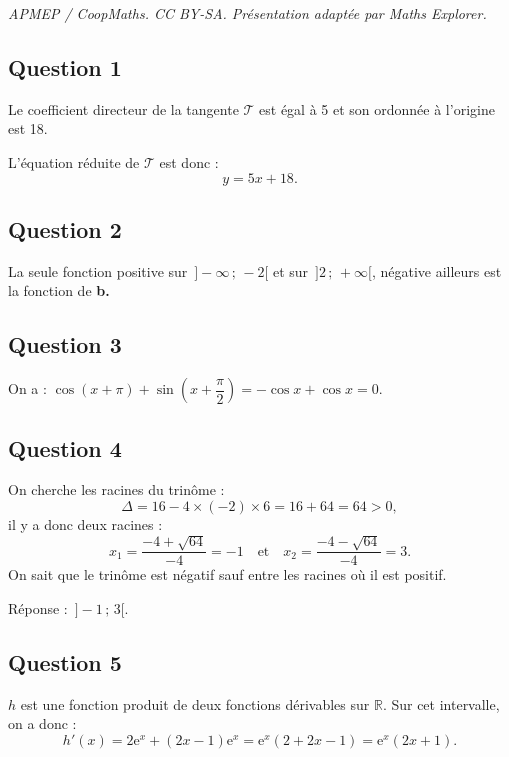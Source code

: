 \documentclass[10pt]{article}
\providecommand{\e}{{\mathrm{e}}}
\begin{document}
\noindent\textit{APMEP / CoopMaths. CC BY-SA. Présentation adaptée par Maths Explorer.}\par\medskip
\subsection*{Question 1}

Le coefficient directeur de la tangente \(\mathcal{T}\) est égal à 5 et son ordonnée à l'origine est 18.

L'équation réduite de \(\mathcal{T}\) est donc :
\[
y = 5x + 18.
\]

\subsection*{Question 2}

La seule fonction positive sur \( \,]-\infty \,;\, -2[ \) et sur \( \,]2 \,;\, +\infty[ \), négative ailleurs est la fonction de \textbf{b.}

\subsection*{Question 3}

On a : \(\cos(x + \pi) + \sin\left(x + \dfrac{\pi}{2}\right) = -\cos x + \cos x = 0\).

\subsection*{Question 4}

On cherche les racines du trinôme :
\[
\Delta = 16 - 4 \times (-2) \times 6 = 16 + 64 = 64 > 0,
\]
il y a donc deux racines :
\[
x_1 = \frac{-4 + \sqrt{64}}{-4} = -1 \quad \text{et} \quad x_2 = \frac{-4 - \sqrt{64}}{-4} = 3.
\]
On sait que le trinôme est négatif sauf entre les racines où il est positif.

Réponse : \( \,]-1 \,;\, 3[\).

\subsection*{Question 5}

\(h\) est une fonction produit de deux fonctions dérivables sur \(\mathbb{R}\). Sur cet intervalle, on a donc :
\[
h'(x) = 2\e^x + (2x - 1)\e^x = \e^x (2 + 2x - 1) = \e^x (2x + 1).
\]
\end{document}
